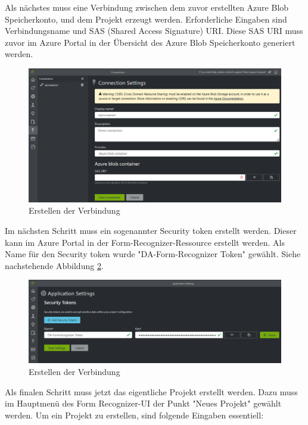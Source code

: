 Als nächstes muss eine Verbindung zwischen dem zuvor erstellten Azure Blob Speicherkonto, und dem Projekt erzeugt werden. Erforderliche Eingaben sind Verbindungsname und SAS (Shared Access Signature) URI. Diese SAS URI muss zuvor im Azure Portal in der Übersicht des Azure Blob Speicherkonto generiert werden.

\begin{figure}[h]
    \centering
    \includegraphics[scale=0.5]{sections/cloud-computing/images/formrecognizer-blob-connection.PNG}
    \caption{Erstellen der Verbindung}
    \label{fig:formrecognizer-blob-connection}
\end{figure}

Im nächsten Schritt muss ein sogenannter Security token erstellt werden. Dieser kann im Azure Portal in der Form-Recognizer-Ressource erstellt werden.
Als Name für den Security token wurde "DA-Form-Recognizer Token" gewählt. Siehe nachstehende Abbildung \ref{fig:formrecognizer-security-token}.

\begin{figure}[h]
    \centering
    \includegraphics[scale=0.5]{sections/cloud-computing/images/formrecognizer-security-token.PNG}
    \caption{Erstellen der Verbindung}
    \label{fig:formrecognizer-security-token}
\end{figure}

Als finalen Schritt muss jetzt das eigentliche Projekt erstellt werden. Dazu muss im Hauptmenü des Form Recognizer-UI der Punkt "Neues Projekt"
gewählt werden. Um ein Projekt zu erstellen, sind folgende Eingaben essentiell:

